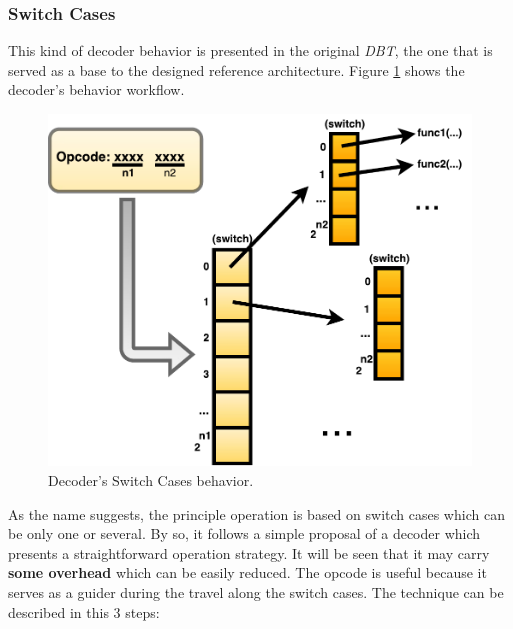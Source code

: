 \subsubsection{Switch Cases}
    This kind of decoder behavior is presented in the original \textit{DBT}, the one that is served as a base to the designed reference architecture. Figure \ref{fig:Decoders_Behavior1} shows the decoder's behavior workflow.

    \begin{figure}[!htb]
        \centerline{
        \includegraphics[scale=0.5]{images/Decoders_Behavior1}
        }
        \caption{Decoder's Switch Cases behavior.}
        \label{fig:Decoders_Behavior1} 
        \end{figure}
    
     As the name suggests, the principle operation is based on switch cases which can be only one or several. By so, it follows a simple proposal of a decoder which presents a straightforward operation strategy. It will be seen that it may carry \textbf{some overhead} which can be easily reduced. The opcode is useful because it serves as a guider during the travel along the switch cases. The technique can be described in this 3 steps:
    
